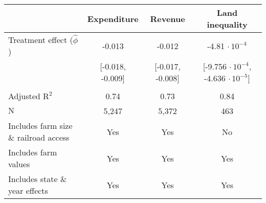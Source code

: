 	\begin{tabular}{@{}lccc@{}}
		\toprule
		& Expenditure             & Revenue                 & Land inequality \\ \midrule
		Treatment effect ($\hat{\phi}$) & -0.013  &  -0.012  &   -4.81 $\cdot\,10^{-4}$        \\
										 &  [-0.018, -0.009] &  [-0.017, -0.008] &   [-9.756 $\cdot\,10^{-4}$, -4.636 $\cdot\,10^{-5}$]         \\
									  &                   &                    &          \\
		Adjusted $\text{R}^2$                           & 0.74                    & 0.73                    &   0.84         \\
		$\text{N}$                             & 5,247                   & 5,372                  &  463          \\
		Includes farm size \& railroad access                      & Yes                  & Yes                 &  No         \\
		Includes farm values                      & Yes                  & Yes                 &  Yes         \\
		Includes state \& year effects               & Yes                  & Yes                 &  Yes         \\
		 \bottomrule
	\end{tabular}
